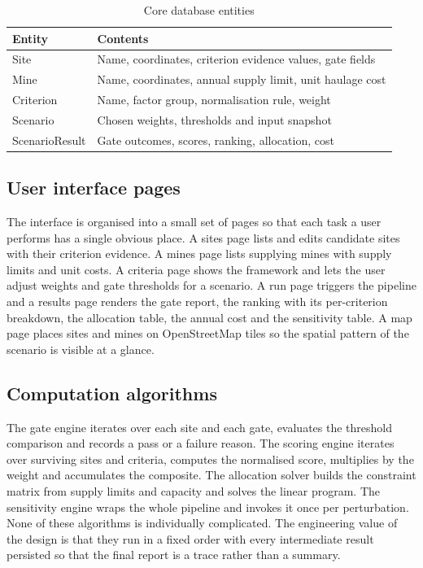 \documentclass[12pt,a4paper]{report}
\begin{document}
\begin{table}[h]
\centering
\caption{Core database entities}
\begin{tabular}{p{3.4cm}p{9.6cm}}
\toprule
Entity & Contents \\
\midrule
Site & Name, coordinates, criterion evidence values, gate fields \\
Mine & Name, coordinates, annual supply limit, unit haulage cost \\
Criterion & Name, factor group, normalisation rule, weight \\
Scenario & Chosen weights, thresholds and input snapshot \\
ScenarioResult & Gate outcomes, scores, ranking, allocation, cost \\
\bottomrule
\end{tabular}
\end{table}

\subsection{User interface pages}
The interface is organised into a small set of pages so that each task
a user performs has a single obvious place. A sites page lists and
edits candidate sites with their criterion evidence. A mines page
lists supplying mines with supply limits and unit costs. A criteria
page shows the framework and lets the user adjust weights and gate
thresholds for a scenario. A run page triggers the pipeline and a
results page renders the gate report, the ranking with its
per-criterion breakdown, the allocation table, the annual cost and the
sensitivity table. A map page places sites and mines on OpenStreetMap
tiles so the spatial pattern of the scenario is visible at a glance.

\subsection{Computation algorithms}
The gate engine iterates over each site and each gate, evaluates the
threshold comparison and records a pass or a failure reason. The
scoring engine iterates over surviving sites and criteria, computes
the normalised score, multiplies by the weight and accumulates the
composite. The allocation solver builds the constraint matrix from
supply limits and capacity and solves the linear program. The
sensitivity engine wraps the whole pipeline and invokes it once per
perturbation. None of these algorithms is individually complicated.
The engineering value of the design is that they run in a fixed order
with every intermediate result persisted so that the final report is a
trace rather than a summary.
\end{document}
